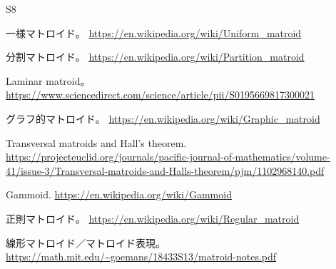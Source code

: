 \documentclass[a4paper, 11pt, dvipdfmx]{jsarticle}
\theoremstyle{definition}
\begin{document}
\begin{thebibliography}{S8}

一様マトロイド。
\url{https://en.wikipedia.org/wiki/Uniform_matroid}

分割マトロイド。
\url{https://en.wikipedia.org/wiki/Partition_matroid}

Laminar matroid。
\url{https://www.sciencedirect.com/science/article/pii/S0195669817300021}

グラフ的マトロイド。
\url{https://en.wikipedia.org/wiki/Graphic_matroid}

Transversal matroids and Hall's theorem.
\url{https://projecteuclid.org/journals/pacific-journal-of-mathematics/volume-41/issue-3/Transversal-matroids-and-Halls-theorem/pjm/1102968140.pdf}

Gammoid.
\url{https://en.wikipedia.org/wiki/Gammoid}

正則マトロイド。
\url{https://en.wikipedia.org/wiki/Regular_matroid}

線形マトロイド／マトロイド表現。
\url{https://math.mit.edu/~goemans/18433S13/matroid-notes.pdf}

\end{thebibliography}
\end{document}
